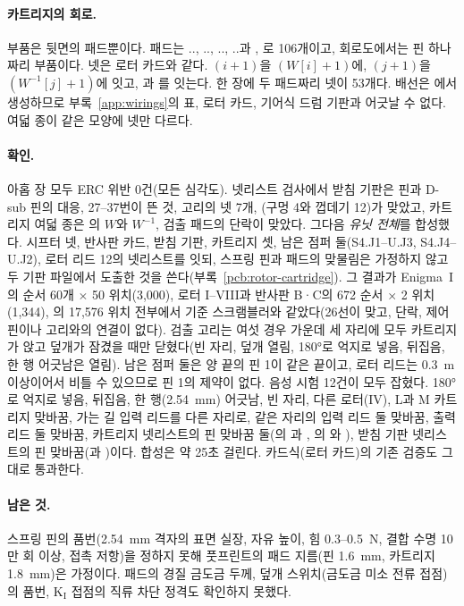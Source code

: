 \paragraph{카트리지의 회로.} 부품은 뒷면의 패드뿐이다. 패드는 .., ..,
.., ..과 , 로 106개이고, 회로도에서는 핀 하나짜리 부품이다.
넷은 로터 카드와 같다. $(i+1)$을 $(W[i]+1)$에, $(j+1)$을 $(W^{-1}[j]+1)$에 잇고,
과 를 잇는다. 한 장에 두 패드짜리 넷이 53개다. 배선은 에서 생성하므로
부록~\ref{app:wirings}의 표, 로터 카드, 기어식 드럼 기판과 어긋날 수 없다. 여덟 종이 같은 모양에 넷만 다르다.

\paragraph{확인.} 아홉 장 모두 ERC 위반 0건(모든 심각도). 넷리스트 검사에서 받침 기판은 핀과 D-sub 핀의 대응, 27--37번이
뜬 것, 고리의 넷 7개, (구멍 4와 껍데기 12)가 맞았고, 카트리지 여덟 종은 의 $W$와 $W^{-1}$,
검출 패드의 단락이 맞았다. 그다음 \emph{유닛 전체}를 합성했다. 시프터 넷, 반사판 카드, 받침 기판, 카트리지 셋, 남은 점퍼
둘(S4.J1--U.J3, S4.J4--U.J2), 로터 리드 12의 넷리스트를 잇되, 스프링 핀과 패드의 맞물림은 가정하지 않고 두 기판 파일에서
도출한 것을 쓴다(부록~\ref{pcb:rotor-cartridge}). 그 결과가 Enigma~I의 순서 60개 $\times$ 50 위치(3,000), 로터 I--VIII과
반사판 B·C의 672 순서 $\times$ 2 위치(1,344), 의 17,576 위치 전부에서 기준 스크램블러와 같았다(26선이 맞고,
단락, 제어 핀이나 고리와의 연결이 없다). 검출 고리는 여섯 경우 가운데 세 자리에 모두 카트리지가 앉고 덮개가 잠겼을 때만
닫혔다(빈 자리, 덮개 열림, 180°로 억지로 넣음, 뒤집음, 한 행 어긋남은 열림). 남은 점퍼 둘은 양 끝의 핀 1이 같은 끝이고,
로터 리드는 0.3~m 이상이어서 비틀 수 있으므로 핀 1의 제약이 없다. 음성 시험 12건이 모두 잡혔다. 180°로 억지로 넣음,
뒤집음, 한 행(2.54~mm) 어긋남, 빈 자리, 다른 로터(IV), L과 M 카트리지 맞바꿈, 가는 길 입력 리드를 다른 자리로, 같은
자리의 입력 리드 둘 맞바꿈, 출력 리드 둘 맞바꿈, 카트리지 넷리스트의 핀 맞바꿈 둘(의 과
, 의 와 ), 받침 기판 넷리스트의 핀 맞바꿈(과 )이다.
합성은 약 25초 걸린다. 카드식(로터 카드)의 기존 검증도 그대로 통과한다.

\paragraph{남은 것.} 스프링 핀의 품번(2.54~mm 격자의 표면 실장, 자유 높이, 힘 0.3--0.5~N, 결합 수명 10만 회 이상, 접촉
저항)을 정하지 못해 풋프린트의 패드 지름(핀 1.6~mm, 카트리지 1.8~mm)은 가정이다. 패드의 경질 금도금 두께, 덮개
스위치(금도금 미소 전류 접점)의 품번, K$_\mathrm{I}$ 접점의 직류 차단 정격도 확인하지 못했다.

